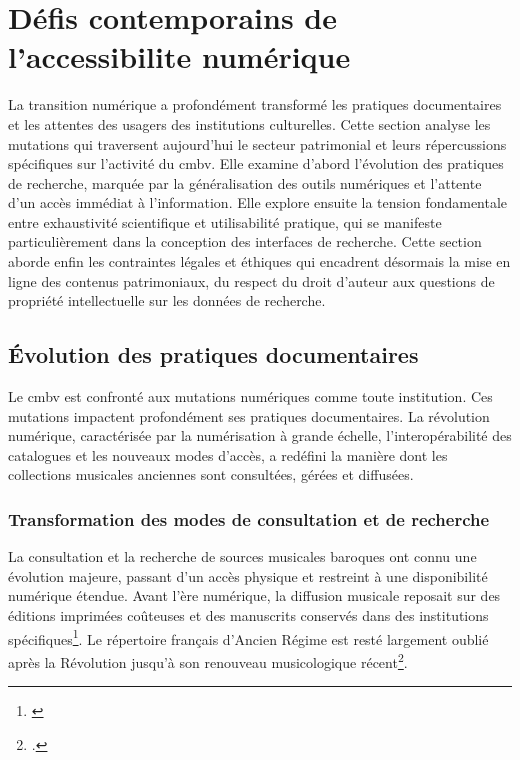 \section{Défis contemporains de l’\gls{accessibilite} numérique}

La transition numérique a profondément transformé les pratiques documentaires et les attentes des usagers des institutions culturelles. Cette section analyse les mutations qui traversent aujourd'hui le secteur patrimonial et leurs répercussions spécifiques sur l'activité du \gls{cmbv}. Elle examine d'abord l'évolution des pratiques de recherche, marquée par la généralisation des outils numériques et l'attente d'un accès immédiat à l'information. Elle explore ensuite la tension fondamentale entre exhaustivité scientifique et utilisabilité pratique, qui se manifeste particulièrement dans la conception des interfaces de recherche. Cette section aborde enfin les contraintes légales et éthiques qui encadrent désormais la mise en ligne des contenus patrimoniaux, du respect du droit d'auteur aux questions de propriété intellectuelle sur les données de recherche.

\subsection{Évolution des pratiques documentaires}

Le \gls{cmbv} est confronté aux mutations numériques comme toute institution. Ces mutations impactent profondément ses pratiques documentaires. La révolution numérique, caractérisée par la numérisation à grande échelle, l'interopérabilité des catalogues et les nouveaux modes d'accès, a redéfini la manière dont les collections musicales anciennes sont consultées, gérées et diffusées.

\subsubsection{Transformation des modes de consultation et de recherche}

La consultation et la recherche de sources musicales baroques ont connu une évolution majeure, passant d'un accès physique et restreint à une disponibilité numérique étendue. Avant l'ère numérique, la diffusion musicale reposait sur des éditions imprimées coûteuses et des manuscrits conservés dans des institutions spécifiques\footnote{\cite{dillonMusicManuscripts2011}}. Le répertoire français d'Ancien Régime est resté largement oublié après la Révolution jusqu'à son renouveau musicologique récent\footcite{CentreMusiqueBaroquea}.

